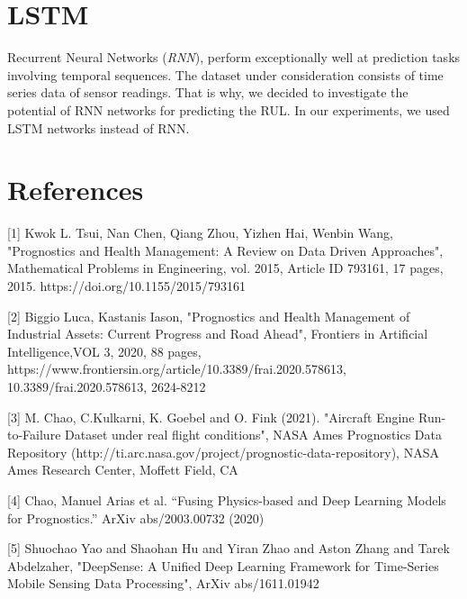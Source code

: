 \documentclass[a4paper,12pt]{article}
\begin{document}




\section{LSTM}

Recurrent Neural Networks (\textit{RNN}), perform exceptionally well at
prediction tasks involving temporal sequences. The dataset under consideration
consists of time series data of sensor readings. That is why, we decided to
investigate the potential of RNN networks for predicting the RUL. In our
experiments, we used LSTM networks instead of RNN.



\section*{References}

\medskip
\small
[1] Kwok L. Tsui, Nan Chen, Qiang Zhou, Yizhen Hai, Wenbin Wang, "Prognostics and Health Management: A Review on Data Driven Approaches", Mathematical Problems in Engineering, vol. 2015, Article ID 793161, 17 pages, 2015. https://doi.org/10.1155/2015/793161

[2] Biggio Luca, Kastanis Iason, "Prognostics and Health Management of Industrial Assets: Current Progress and Road Ahead", Frontiers in Artificial Intelligence,VOL 3, 2020, 88 pages, https://www.frontiersin.org/article/10.3389/frai.2020.578613, 10.3389/frai.2020.578613, 2624-8212

[3] M. Chao, C.Kulkarni, K. Goebel and O. Fink (2021). "Aircraft Engine Run-to-Failure Dataset under real flight conditions", NASA Ames Prognostics Data Repository (http://ti.arc.nasa.gov/project/prognostic-data-repository), NASA Ames Research Center, Moffett Field, CA

[4] Chao, Manuel Arias et al. “Fusing Physics-based and Deep Learning Models for Prognostics.” ArXiv abs/2003.00732 (2020)

[5] Shuochao Yao and Shaohan Hu and Yiran Zhao and Aston Zhang and Tarek Abdelzaher, "DeepSense: A Unified Deep Learning Framework for Time-Series Mobile Sensing Data Processing", ArXiv abs/1611.01942


\end{document}
